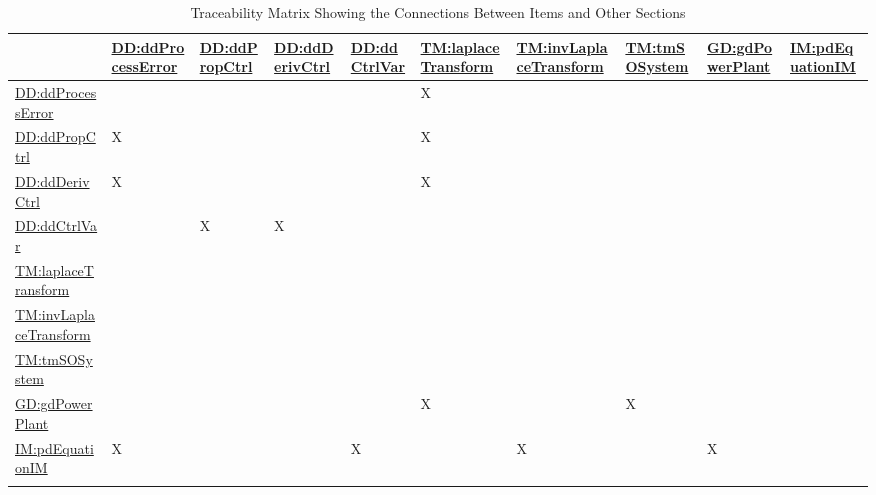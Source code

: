 \documentclass[12pt]{article}
\begin{document}
\begin{longtable}{l l l l l l l l l l}
\toprule
\textbf{} & \textbf{\hyperref[DD:ddProcessError]{DD:ddProcessError}} & \textbf{\hyperref[DD:ddPropCtrl]{DD:ddPropCtrl}} & \textbf{\hyperref[DD:ddDerivCtrl]{DD:ddDerivCtrl}} & \textbf{\hyperref[DD:ddCtrlVar]{DD:ddCtrlVar}} & \textbf{\hyperref[TM:laplaceTransform]{TM:laplaceTransform}} & \textbf{\hyperref[TM:invLaplaceTransform]{TM:invLaplaceTransform}} & \textbf{\hyperref[TM:tmSOSystem]{TM:tmSOSystem}} & \textbf{\hyperref[GD:gdPowerPlant]{GD:gdPowerPlant}} & \textbf{\hyperref[IM:pdEquationIM]{IM:pdEquationIM}}
\\
\midrule
\endhead
\hyperref[DD:ddProcessError]{DD:ddProcessError} &  &  &  &  & X &  &  &  & 
\\
\hyperref[DD:ddPropCtrl]{DD:ddPropCtrl} & X &  &  &  & X &  &  &  & 
\\
\hyperref[DD:ddDerivCtrl]{DD:ddDerivCtrl} & X &  &  &  & X &  &  &  & 
\\
\hyperref[DD:ddCtrlVar]{DD:ddCtrlVar} &  & X & X &  &  &  &  &  & 
\\
\hyperref[TM:laplaceTransform]{TM:laplaceTransform} &  &  &  &  &  &  &  &  & 
\\
\hyperref[TM:invLaplaceTransform]{TM:invLaplaceTransform} &  &  &  &  &  &  &  &  & 
\\
\hyperref[TM:tmSOSystem]{TM:tmSOSystem} &  &  &  &  &  &  &  &  & 
\\
\hyperref[GD:gdPowerPlant]{GD:gdPowerPlant} &  &  &  &  & X &  & X &  & 
\\
\hyperref[IM:pdEquationIM]{IM:pdEquationIM} & X &  &  & X &  & X &  & X & 
\\
\bottomrule
\caption{Traceability Matrix Showing the Connections Between Items and Other Sections}
\label{Table:TraceMatRefvsRef}
\end{longtable}
\end{document}
